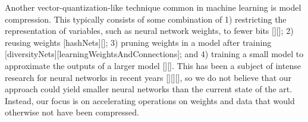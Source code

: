 Another vector-quantization-like technique common in machine learning is model compression. This typically consists of some combination of 1) restricting the representation of variables, such as neural network weights, to fewer bits [][]; 2) reusing weights [hashNets][]; 3) pruning weights in a model after training [diversityNets][learningWeightsAndConnections]; and 4) training a small model to approximate the outputs of a larger model [][]. This has been a subject of intense research for neural networks in recent years [][][], so we do not believe that our approach could yield smaller neural networks than the current state of the art. Instead, our focus is on accelerating operations on weights and data that would otherwise not have been compressed.%









